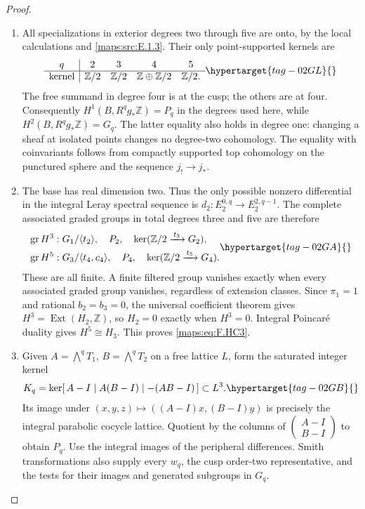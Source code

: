 \documentclass[11pt,a4paper]{article}
\numberwithin{equation}{section}
\theoremstyle{definition}
\begin{document}
\begin{proof}
\begin{enumerate}[label=\arabic*.]
\item All specializations in exterior degrees two through
five are onto, by the local calculations and \cref{maps:src:E.1.3}.
Their only point-supported kernels are
\begin{equation}
\begin{array}{c|cccc}
q&2&3&4&5\\ \hline
\text{kernel}&\mathbb Z/2&\mathbb Z/2&
                 \mathbb Z\oplus\mathbb Z/2&\mathbb Z/2 .
\end{array}
\hypertarget{tag-02GL}{}\label{maps:eq:F.HC9}
\end{equation}
The free summand in degree four is at the cusp; the
others are at four.
Consequently $H^1(B,R^qg_*\mathbb Z)=P_q$ in the
degrees used here, while
$H^2(B,R^qg_*\mathbb Z)=G_q$.
The latter equality also holds in degree one:
changing a sheaf at isolated points changes no
degree-two cohomology.  The equality with coinvariants
follows from compactly supported top cohomology on
the punctured sphere and the sequence $j_!\to j_*$.

\item The base has real dimension two.
Thus the only possible nonzero differential in the
integral Leray spectral sequence is
$d_2:E_2^{0,q}\to E_2^{2,q-1}$.
The complete associated graded groups in total
degrees three and five are therefore
\begin{equation}
\begin{split}
 \operatorname{gr}H^3&:
   G_1/\langle t_2\rangle,\quad P_2,\quad
   \ker(\mathbb Z/2\xrightarrow{\,t_3\,}G_2),\\
 \operatorname{gr}H^5&:
   G_3/\langle t_4,c_4\rangle,\quad P_4,\quad
   \ker(\mathbb Z/2\xrightarrow{\,t_5\,}G_4).
\end{split}
\hypertarget{tag-02GA}{}\label{maps:eq:F.HC10}
\end{equation}
These are all finite.  A finite filtered group
vanishes exactly when every associated graded group
vanishes, regardless of extension classes.
Since $\pi_1=1$ and rational $b_2=b_3=0$, the universal
coefficient theorem gives
$H^3=\operatorname{Ext}(H_2,\mathbb Z)$, so
$H_2=0$ exactly when $H^3=0$.
Integral Poincar\'e duality gives $H^5\cong H_3$.
This proves \eqref{maps:eq:F.HC3}.

\item Given $A=\bigwedge^qT_1$, $B=\bigwedge^qT_2$ on a
free lattice $L$, form the saturated integer kernel
\begin{equation}
 K_q=\ker[\,A-I\mid A(B-I)\mid -(AB-I)\,]\subset L^3.
 \hypertarget{tag-02GB}{}\label{maps:eq:F.HC11}
\end{equation}
Its image under
$(x,y,z)\mapsto((A-I)x,(B-I)y)$ is precisely the
integral parabolic cocycle lattice.
Quotient by the columns of
$\left(\begin{smallmatrix}A-I\\B-I\end{smallmatrix}\right)$
to obtain $P_q$.
Use the integral images of the peripheral differences.
Smith transformations also supply every $w_q$, the
cusp order-two representative, and the tests for
their images and generated subgroups in $G_q$.


\end{enumerate}
\end{proof}
\end{document}
